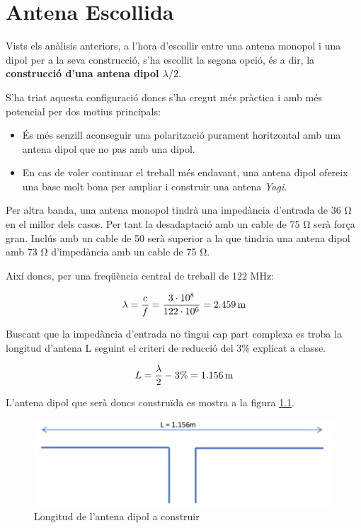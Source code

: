 \chapter{Antena Escollida}

Vists els anàlisis anteriors, a l'hora d'escollir entre una antena monopol i una dipol per a la seva construcció, s'ha escollit la segona opció, és a dir, la \textbf{construcció d'una antena dipol $\lambda/2$}.

S'ha triat aquesta configuració doncs s'ha cregut més pràctica i amb més potencial per dos motius principals:
\begin{itemize}
\item És més senzill aconseguir una polarització purament horitzontal amb una antena dipol que no pas amb una dipol.
\item En cas de voler continuar el treball més endavant, una antena dipol ofereix una base molt bona per ampliar i construir una antena \textit{Yagi}.
\end{itemize}

Per altra banda, una antena monopol tindrà una impedància d’entrada de 36 $\si{\ohm}$ en el millor dels casos. Per tant la desadaptació amb un cable de 75 $\si{\ohm}$ serà força gran. Inclús amb un cable de 50 serà superior a la que tindria una antena dipol amb 73 $\si{\ohm}$ d'impedància amb un cable de 75 $\si{\ohm}$.

Així doncs, per una freqüència central de treball de 122 MHz:

\begin{equation}
\notag
  \lambda=\frac{c}{f}=\frac{3\cdot10^8}{122\cdot10^6}= 2.459\,\mathrm{m}
\end{equation}

Buscant que la impedància d'entrada no tingui cap part complexa es troba la longitud d'antena L seguint el criteri de reducció del 3\% explicat a classe. 

\begin{equation}
\notag
  L=\frac{\lambda}{2}-3\%= 1.156\,\mathrm{m}
\end{equation}

L'antena dipol que serà doncs construïda es mostra a la figura \ref{LAntena}.
\begin{figure}[H]
\includegraphics[width=1\textwidth]{./images/LAntena}
\caption{Longitud de l'antena dipol a construir}
\label{LAntena}
\end{figure}




